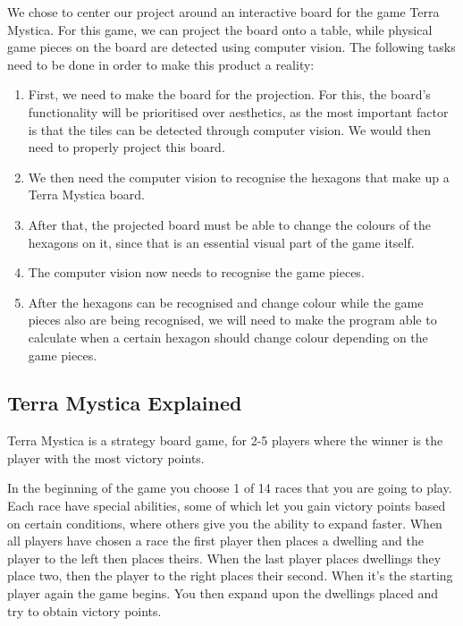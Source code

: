 \bigskip

We chose to center our project around an interactive board for the game Terra Mystica. For this game, we can project the board onto a table, while physical game pieces on the board are detected using computer vision. The following tasks need to be done in order to make this product a reality:


\begin{enumerate}
\item First, we need to make the board for the projection. For this, the board's functionality will be prioritised over aesthetics, as the most important factor is that the tiles can be detected through computer vision. We would then need to properly project this board.
\item We then need the computer vision to recognise the hexagons that make up a Terra Mystica board.
\item After that, the projected board must be able to change the colours of the hexagons on it, since that is an essential visual part of the game itself.
\item The computer vision now needs to recognise the game pieces.
\item After the hexagons can be recognised and change colour while the game pieces also are being recognised, we will need to make the program able to calculate when a certain hexagon should change colour depending on the game pieces.
\end{enumerate}


\subsection{Terra Mystica Explained}

Terra Mystica is a strategy board game, for 2-5 players where the winner is the player with the most victory points. 

In the beginning of the game you choose 1 of 14 races that you are going to play. Each race have special abilities, some of which let you gain victory points based on certain conditions, where others give you the ability to expand faster. When all players have chosen a race the first player then places a dwelling and the player to the left then places theirs. When the last player places dwellings they place two, then the player to the right places their second. When it's the starting player again the game begins. You then expand upon the dwellings placed and try to obtain victory points.

